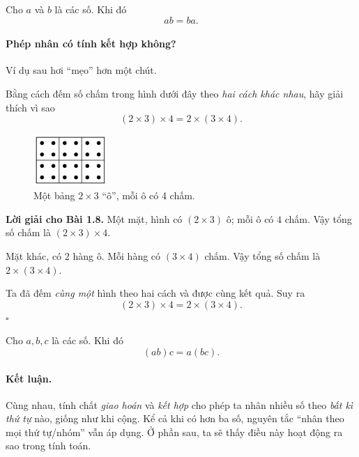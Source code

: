 \begin{tcolorbox}[colback=yellow!10, colframe=orange!80!black,
title={Quan trọng: Phép nhân có tính \emph{giao hoán}}]
Cho \(a\) và \(b\) là các số. Khi đó
\[
ab = ba.
\]
\end{tcolorbox}

\paragraph{Phép nhân có tính kết hợp không?}
Ví dụ sau hơi “mẹo” hơn một chút.

\begin{problem}[1.8]
Bằng cách đếm số chấm trong hình dưới đây theo \emph{hai cách khác nhau},
hãy giải thích vì sao
\[
(2\times3)\times4 = 2\times(3\times4).
\]

\begin{figure}[h!]
  \centering
  \includegraphics[width=0.25\textwidth]{img/fig-prob1.8.pdf}
  \caption*{\small Một bảng \(2\times3\) “ô”, mỗi ô có 4 chấm.}
\end{figure}
\end{problem}

\noindent\textbf{Lời giải cho Bài 1.8.}
Một mặt, hình có \((2\times3)\) ô; mỗi ô có \(4\) chấm. Vậy tổng số chấm là
\((2\times3)\times4\).

Mặt khác, có \(2\) hàng ô. Mỗi hàng có \((3\times4)\) chấm. Vậy tổng số chấm là
\(2\times(3\times4)\).

Ta đã đếm \emph{cùng một} hình theo hai cách và được cùng kết quả. Suy ra
\[
(2\times3)\times4 = 2\times(3\times4).
\]
\(\square\)

\begin{tcolorbox}[colback=yellow!10, colframe=orange!80!black,
title={Quan trọng: Phép nhân có tính \emph{kết hợp}}]
Cho \(a,b,c\) là các số. Khi đó
\[
(ab)c = a(bc).
\]
\end{tcolorbox}

\paragraph{Kết luận.}
Cùng nhau, tính chất \emph{giao hoán} và \emph{kết hợp} cho phép ta nhân
nhiều số theo \emph{bất kì thứ tự} nào, giống như khi cộng. Kể cả khi có
hơn ba số, nguyên tắc “nhân theo mọi thứ tự/nhóm” vẫn áp dụng. Ở phần sau,
ta sẽ thấy điều này hoạt động ra sao trong tính toán.

